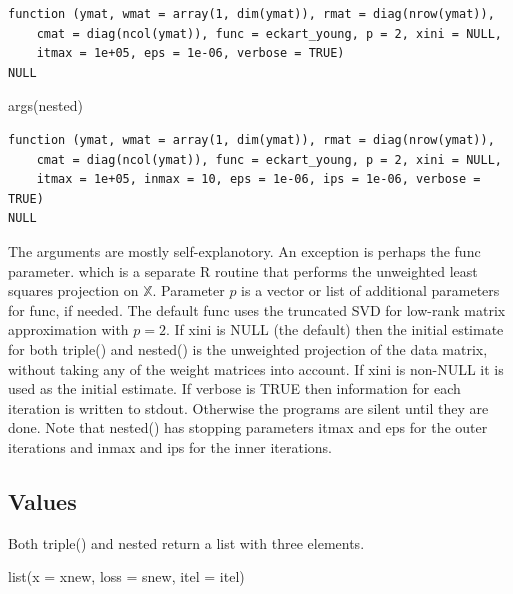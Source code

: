 \documentclass[
  12pt,
  letterpaper,
  DIV=11,
  numbers=noendperiod]{scrartcl}
\newenvironment{Shaded}{\begin{snugshade}}{\end{snugshade}}
\newcommand{\AttributeTok}[1]{\textcolor[rgb]{0.40,0.45,0.13}{#1}}
\newcommand{\FunctionTok}[1]{\textcolor[rgb]{0.28,0.35,0.67}{#1}}
\newcommand{\NormalTok}[1]{\textcolor[rgb]{0.00,0.23,0.31}{#1}}
\begin{document}
\begin{verbatim}
function (ymat, wmat = array(1, dim(ymat)), rmat = diag(nrow(ymat)), 
    cmat = diag(ncol(ymat)), func = eckart_young, p = 2, xini = NULL, 
    itmax = 1e+05, eps = 1e-06, verbose = TRUE) 
NULL
\end{verbatim}

\begin{Shaded}
\begin{Highlighting}[]
\FunctionTok{args}\NormalTok{(nested)}
\end{Highlighting}
\end{Shaded}

\begin{verbatim}
function (ymat, wmat = array(1, dim(ymat)), rmat = diag(nrow(ymat)), 
    cmat = diag(ncol(ymat)), func = eckart_young, p = 2, xini = NULL, 
    itmax = 1e+05, inmax = 10, eps = 1e-06, ips = 1e-06, verbose = TRUE) 
NULL
\end{verbatim}

The arguments are mostly self-explanotory. An exception is perhaps the
func parameter. which is a separate R routine that performs the
unweighted least squares projection on \(\mathbb{X}\). Parameter \(p\)
is a vector or list of additional parameters for func, if needed. The
default func uses the truncated SVD for low-rank matrix approximation
with \(p=2\). If xini is NULL (the default) then the initial estimate
for both triple() and nested() is the unweighted projection of the data
matrix, without taking any of the weight matrices into account. If xini
is non-NULL it is used as the initial estimate. If verbose is TRUE then
information for each iteration is written to stdout. Otherwise the
programs are silent until they are done. Note that nested() has stopping
parameters itmax and eps for the outer iterations and inmax and ips for
the inner iterations.

\subsection{Values}\label{values}

Both triple() and nested return a list with three elements.

\begin{Shaded}
\begin{Highlighting}[]
\FunctionTok{list}\NormalTok{(}\AttributeTok{x =}\NormalTok{ xnew, }\AttributeTok{loss =}\NormalTok{ snew, }\AttributeTok{itel =}\NormalTok{ itel)}
\end{Highlighting}
\end{Shaded}
\end{document}
